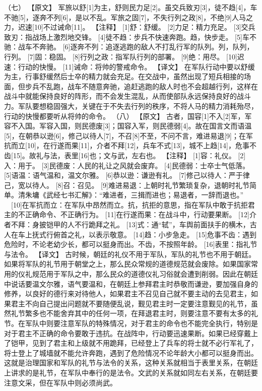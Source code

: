 \documentclass[a4paper,12pt,UTF8,twoside]{ctexbook}
\begin{document}
（七）
【原文】
军旅以舒[1]为主，舒则民力足[2]。虽交兵致刃[3]，徒不趋[4]，车不驰[5]，逐奔不列[6]，是以不乱。军旅之固[7]，不失行列之政[8]，不绝[9]人马之力，迟速[10]不过诫命[11]。
【注释】
[1]舒：舒缓。
[2]力足：精力充足。
[3]交兵致刃：指战场上激烈地交锋。
[4]徒不趋：步兵不快速奔跑。趋，快步走。
[5]车不驰：战车不奔驰。
[6]逐奔不列：追逐逃跑的敌人不打乱行军的队列。列，队列，行列。
[7]固：稳固。
[8]行列之政：指军队行列的部署。
[9]绝：用尽。
[10]迟速：行动的快慢。
[11]诫命：将帅的警戒命令。
【译文】
在军队行动中要以舒缓为主，行事舒缓然后士卒的精力就会充足。在交战中，虽然出现了短兵相接的场面，但步兵不乱跑，战车不随意奔驰，追赶逃跑的敌人时也不会超越行列，这样在战斗中就能保持良好的阵形，而不会发生混乱，从而使部队永远保持良好的战斗力。军队要想稳固强大，关键在于不失去行列的秩序，不将人马的精力消耗殆尽，行动的快慢都要听从将帅的命令。
（八）
【原文】
古者，国容[1]不入[2]军，军容不入国。军容入国，则民德废[3]；国容入军，则民德弱[4]。故在国言文而语温[5]，在朝恭以逊[6]，修己以待人[7]，不召[8]不至，不问不言，难进易退[9]；在军抗而立[10]，在行遂而果[11]，介者不拜[12]，兵车不式[13]，城不上趋[14]，危事不齿[15]。故礼与法，表里[16]也；文与武，左右也。
【注释】
[1]容：礼仪。
[2]入：用于。
[3]民德废：人民的礼让之风就会废弃。
[4]民德弱：士卒士气低落。
[5]语温：语气温和，温文尔雅。
[6]恭以逊：谦逊有礼。
[7]修己以待人：严于律己，宽以待人。
[8]召：召见。
[9]难进易退：上朝时礼节繁琐复杂，退朝时礼节简单。清朱墉《武经七书汇解》：“难进者，三揖而进也；易退者，一辞而退也。”
　[10]在军抗而立：在军队中昂然而立。抗，抗拒的意思，指在军队中敢于抗拒君主的不正确命令、不正确行为。
[11]在行遂而果：在战斗中，行动要果断。
[12]介者不拜：身披铠甲的人不行跪拜之礼。
[13]式：通“轼”，车舆前面扶手的横木，古人在车上抚式行俯首之礼，以表示敬意。
[14]趋：小步急走。
[15]危事不齿：遇到危险时，不论老幼少长，都可以挺身而出。不齿，不按照年龄。
[16]表里：指礼节与法令。
【译文】
古时候，朝廷的礼仪不用于军队，军队的礼节也不用于朝廷。如果将军队的礼节用于朝堂之上，那么民众常规的道德规范就会废除。如果国家常用的仪礼规范用于军队之中，那么民众的道德仪礼习俗就会遭到削弱。因此在朝廷中说话要温文尔雅，语气要温和，在朝廷上参拜君主时恭敬而谦逊，要加强自身的修养，以良好的德行来对待他人，如果君主不召见自己就不要主动的去见君主，如果君主不向自己提出问题就不要随便乱说，觐见君主时一定要注意觐见的礼节，虽然礼节繁多也不能舍弃其中的任何一项，在拜退君主时，则要注意不要有太多的礼节。在军队中则要注意军队的特殊情况，对于君主的命令也不能完全执行，特别是对于君主不正确的命令要敢于违抗。在战阵中，行动要迅速果断。如果已经穿戴上了铠甲，见到了君主和上级就不用跪拜，已经登上了兵车的将士就不必行军礼了，将士登上了城墙就不能允许奔跑，遇到了危险情况不论年龄大小都可以挺身而出。这就是治理国家和军队的礼节与法令的关系，这种关系就相当于表里关系，在朝廷上讲求的是礼节，在军队中奉行的是法令。文武的关系就如同左右关系，在朝廷要注意文采，但在军队中则必须尚武。
\end{document}

